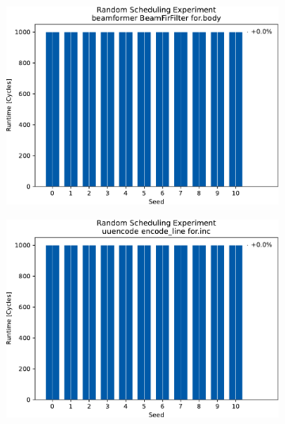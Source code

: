 \begin{figure}
    \vspace{0.5cm}
    \begin{subfigure}{0.0325\textwidth}\caption{}\label{fig:eval:rndm:aurora:e}\end{subfigure}
    \begin{subfigure}{0.44\textwidth}
        \includegraphics[width=\textwidth]{img/random-scheduling-experiment-aurora-collected/beamformer-crop.pdf}
    \end{subfigure}
    \hfill
    \begin{subfigure}{0.0325\textwidth}\caption{}\label{fig:eval:rndm:aurora:f}\end{subfigure}
    \begin{subfigure}{0.44\textwidth}
        \includegraphics[width=\textwidth]{img/random-scheduling-experiment-aurora-collected/uuencode-crop.pdf}
    \end{subfigure}


\end{figure}
